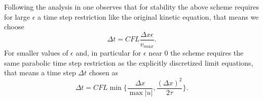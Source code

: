 \documentclass[final,11pt]{siamart251216}
\numberwithin{equation}{section}
\theoremstyle{definition}
\theoremstyle{remark}
\begin{document}
\begin{remark}
	
	
\end{remark}

\begin{remark}
	\label{remCFL}
	Following the analysis in \cite{Bosc1} one observes that for stability the above scheme requires for large
	$\epsilon$
	a time step restriction like  the original kinetic equation, that means we choose 
	\begin{equation}
		\label{CFL}
		\Delta t  =  CFL \frac{ \Delta x \epsilon }{v_{max} }.
	\end{equation}
	For smaller values of $\epsilon $ and, in particular for $\epsilon $ near $0$ the scheme requires the same
	parabolic time step restriction as the explicitly discretized  limit equations, that means a time step $\Delta t$ chosen as 
	\begin{equation}
		\label{CFL2}
		\Delta t  =  CFL  \min\{\frac{ \Delta x}{\max \vert u \vert} , \frac{( \Delta x)^2}{2 \tau}\}.
	\end{equation}
\end{remark}
\end{document}
